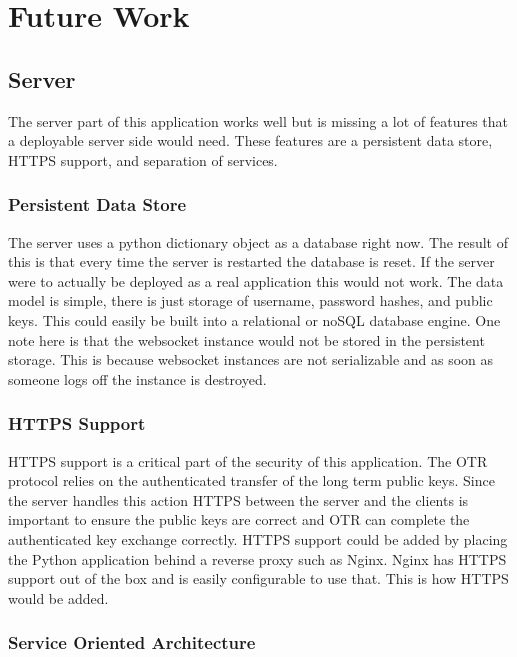 \chapter{Future Work}


\section{Server}


The server part of this application works well but is missing a lot of features that a deployable server side would need. These features are a persistent data store, HTTPS support, and separation of services.


\subsection{Persistent Data Store}


The server uses a python dictionary object as a database right now. The result of this is that every time the server is restarted the database is reset. If the server were to actually be deployed as a real application this would not work. The data model is simple, there is just storage of username, password hashes, and public keys. This could easily be built into a relational or noSQL database engine. One note here is that the websocket instance would not be stored in the persistent storage. This is because websocket instances are not serializable and as soon as someone logs off the instance is destroyed.


\subsection{HTTPS Support}


HTTPS support is a critical part of the security of this application. The OTR protocol relies on the authenticated transfer of the long term public keys. Since the server handles this action HTTPS between the server and the clients is important to ensure the public keys are correct and OTR can complete the authenticated key exchange correctly. HTTPS support could be added by placing the Python application behind a reverse proxy such as Nginx. \cite{nginx} Nginx has HTTPS support out of the box and is easily configurable to use that. This is how HTTPS would be added.


\subsection{Service Oriented Architecture}


